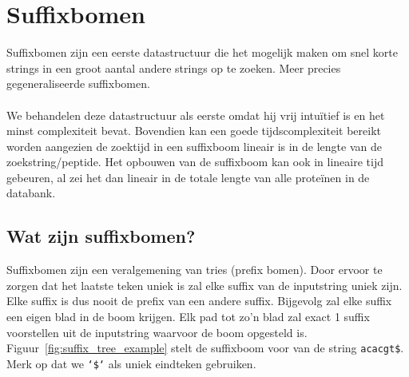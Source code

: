 \chapter{Suffixbomen}\label{ch:suffix-bomen}
Suffixbomen zijn een eerste datastructuur die het mogelijk maken om snel korte strings in een groot aantal andere strings op te zoeken.
Meer precies gegeneraliseerde suffixbomen.
\\ \\
We behandelen deze datastructuur als eerste omdat hij vrij intuïtief is en het minst complexiteit bevat.
Bovendien kan een goede tijdscomplexiteit bereikt worden aangezien de zoektijd in een suffixboom lineair is in de lengte van de zoekstring/peptide.
Het opbouwen van de suffixboom kan ook in lineaire tijd gebeuren, al zei het dan lineair in de totale lengte van alle proteïnen in de databank.

\section{Wat zijn suffixbomen?}\label{sec:wat-zijn-suffix-bomen?}
Suffixbomen zijn een veralgemening van tries (prefix bomen).
Door ervoor te zorgen dat het laatste teken uniek is zal elke suffix van de inputstring uniek zijn.
Elke suffix is dus nooit de prefix van een andere suffix.
Bijgevolg zal elke suffix een eigen blad in de boom krijgen.
Elk pad tot zo'n blad zal exact 1 suffix voorstellen uit de inputstring waarvoor de boom opgesteld is.
Figuur~\ref{fig:suffix_tree_example} stelt de suffixboom voor van de string \texttt{acacgt\$}.
Merk op dat we \texttt{`\$`} als uniek eindteken gebruiken.

